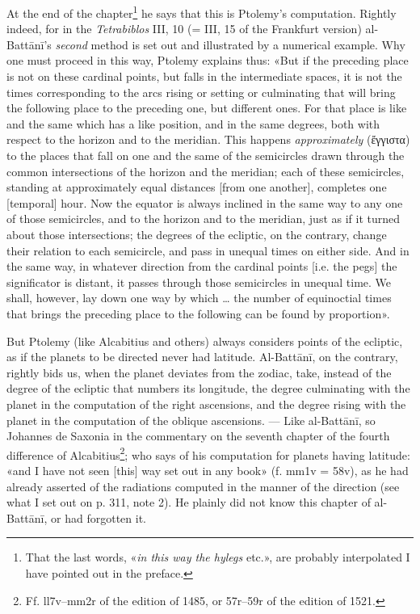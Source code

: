 \documentclass[11pt]{article}
\begin{document}
\par At the end of the chapter\footnote{That the last words, «\emph{in this way the hylegs} etc.», are probably interpolated I have pointed out in the preface.} he says that this is Ptolemy's computation. Rightly indeed, for in the \emph{Tetrabiblos} III, 10 (= III, 15 of the Frankfurt version) al-Battānī's \emph{second} method is set out and illustrated by a numerical example. Why one must proceed in this way, Ptolemy explains thus: «But if the preceding place is not on these cardinal points, but falls in the intermediate spaces, it is not the times corresponding to the arcs rising or setting or culminating that will bring the following place to the preceding one, but different ones. For that place is like and the same which has a like position, and in the same degrees, both with respect to the horizon and to the meridian. This happens \emph{approximately} ({\greekfont ἔγγιστα}) to the places that fall on one and the same of the semicircles drawn through the common intersections of the horizon and the meridian; each of these semicircles, standing at approximately equal distances [from one another], completes one [temporal] hour. Now the equator is always inclined in the same way to any one of those semicircles, and to the horizon and to the meridian, just as if it turned about those intersections; the degrees of the ecliptic, on the contrary, change their relation to each semicircle, and pass in unequal times on either side. And in the same way, in whatever direction from the cardinal points [i.e. the pegs] the significator is distant, it passes through those semicircles in unequal time. We shall, however, lay down one way by which … the number of equinoctial times that brings the preceding place to the following can be found by proportion».\par
\par But Ptolemy (like Alcabitius and others) always considers points of the ecliptic, as if the planets to be directed never had latitude. Al-Battānī, on the contrary, rightly bids us, when the planet deviates from the zodiac, take, instead of the degree of the ecliptic that numbers its longitude, the degree culminating with the planet in the computation of the right ascensions, and the degree rising with the planet in the computation of the oblique ascensions. — Like al-Battānī, so Johannes de Saxonia in the commentary on the seventh chapter of the fourth difference of Alcabitius\footnote{Ff. ll7v–mm2r of the edition of 1485, or 57r–59r of the edition of 1521.}; who says of his computation for planets having latitude: «and I have not seen [this] way set out in any book» (f. mm1v = 58v), as he had already asserted of the radiations computed in the manner of the direction (see what I set out on p. 311, note 2). He plainly did not know this chapter of al-Battānī, or had forgotten it.\par
\end{document}
